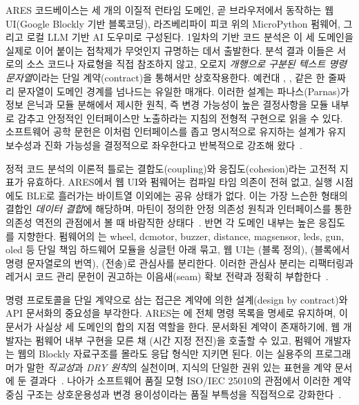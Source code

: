 ARES 코드베이스는 세 개의 이질적 런타임 도메인, 곧 브라우저에서 동작하는 웹 UI(Google Blockly 기반 블록코딩), 라즈베리파이 피코 위의 MicroPython 펌웨어, 그리고 로컬 LLM 기반 AI 도우미로 구성된다. 1일차의 기반 코드 분석은 이 세 도메인을 실제로 이어 붙이는 접착제가 무엇인지 규명하는 데서 출발한다. 분석 결과 이들은 서로의 소스 코드나 자료형을 직접 참조하지 않고, 오로지 \emph{개행으로 구분된 텍스트 명령 문자열}이라는 단일 계약(contract)을 통해서만 상호작용한다. 예컨대 , ,  같은 한 줄짜리 문자열이 도메인 경계를 넘나드는 유일한 매개다. 이러한 설계는 파나스(Parnas)가 정보 은닉과 모듈 분해에서 제시한 원칙, 즉 변경 가능성이 높은 결정사항을 모듈 내부로 감추고 안정적인 인터페이스만 노출하라는 지침의 전형적 구현으로 읽을 수 있다. 소프트웨어 공학 문헌은 이처럼 인터페이스를 좁고 명시적으로 유지하는 설계가 유지보수성과 진화 가능성을 결정적으로 좌우한다고 반복적으로 강조해 왔다~\cite{mcconnell2004codecomplete, martin2008cleancode}.

정적 코드 분석의 이론적 틀로는 결합도(coupling)와 응집도(cohesion)라는 고전적 지표가 유효하다. ARES에서 웹 UI와 펌웨어는 컴파일 타임 의존이 전혀 없고, 실행 시점에도 BLE로 흘러가는 바이트열 이외에는 공유 상태가 없다. 이는 가장 느슨한 형태의 결합인 \emph{데이터 결합}에 해당하며, 마틴이 정의한 안정 의존성 원칙과 인터페이스를 통한 의존성 역전의 관점에서 볼 때 바람직한 상태다~\cite{martin2008cleancode}. 반면 각 도메인 내부는 높은 응집도를 지향한다. 펌웨어의 는 wheel, dcmotor, buzzer, distance, magsensor, leds, gun, oled 등 단일 책임 하드웨어 모듈을 싱글턴  아래 묶고, 웹 UI는 (블록 정의), (블록에서 명령 문자열로의 번역), (전송)로 관심사를 분리한다. 이러한 관심사 분리는 리팩터링과 레거시 코드 관리 문헌이 권고하는 이음새(seam) 확보 전략과 정확히 부합한다~\cite{fowler2018refactoring, feathers2004legacy}.

명령 프로토콜을 단일 계약으로 삼는 접근은 계약에 의한 설계(design by contract)와 API 문서화의 중요성을 부각한다. ARES는 에 전체 명령 목록을 명세로 유지하며, 이 문서가 사실상 세 도메인의 합의 지점 역할을 한다. 문서화된 계약이 존재하기에, 웹 개발자는 펌웨어 내부 구현을 모른 채 (시간 지정 전진)을 호출할 수 있고, 펌웨어 개발자는 웹의 Blockly 자료구조를 몰라도 응답 형식만 지키면 된다. 이는 실용주의 프로그래머가 말한 \emph{직교성}과 \emph{DRY 원칙}의 실천이며, 지식의 단일한 권위 있는 표현을 계약 문서에 둔 결과다~\cite{hunt1999pragmatic}. 나아가 소프트웨어 품질 모형 ISO/IEC 25010의 관점에서 이러한 계약 중심 구조는 상호운용성과 변경 용이성이라는 품질 부특성을 직접적으로 강화한다~\cite{iso25010}.

